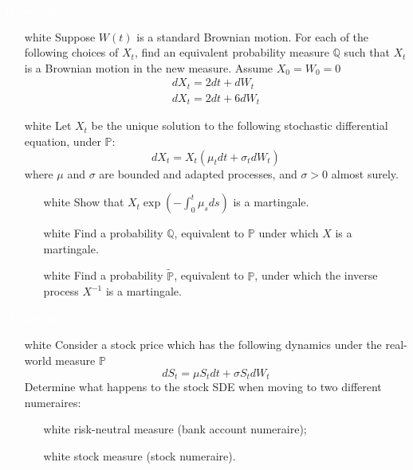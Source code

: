 \documentclass{beamer}
\begin{document}
\begin{homework}
	\begin{frame}{\textcolor{white}{Homework}}
		\begin{itemize}
			\item[white] Suppose $W(t)$ is a standard Brownian motion. For each of the following choices of $X_t$, find an equivalent probability measure $\mathbb{Q}$ such that $X_t$ is a Brownian motion in the new measure. Assume $X_0=W_0=0$
			\begin{equation*}
				\begin{gathered}
					dX_t = 2dt + dW_t\\
					dX_t = 2dt + 6dW_t
				\end{gathered}
			\end{equation*}
		\item[white] Let $X_t$ be the unique solution to the following stochastic differential equation, under $\mathbb{P}$:
		\begin{equation*}
			dX_t = X_t(\mu_t dt + \sigma_t dW_t)
		\end{equation*}
		where $\mu$ and $\sigma$ are bounded and adapted processes, and $\sigma >0$ almost surely.
		\begin{itemize}
			\item[white] Show that $X_t\exp(-\int_0^t \mu_s ds)$ is a martingale.
			\item[white] Find a probability $\mathbb{Q}$, equivalent to $\mathbb{P}$ under which $X$ is a martingale.
			\item[white] Find a probability $\tilde{\mathbb{P}}$, equivalent to $\mathbb{P}$, under which the inverse process $X^{-1}$ is a martingale.
		\end{itemize}
		\end{itemize}
	\end{frame}
\end{homework}


\begin{homework}
\begin{frame}{\textcolor{white}{Homework}}
\begin{itemize}
\item[white] Consider a stock price which has the following dynamics under the real-world measure $\mathbb{P}$
\begin{equation*}
	dS_t = \mu S_t dt + \sigma S_t dW_t
\end{equation*}
Determine what happens to the stock SDE when moving to two different numeraires:
\begin{itemize}
\item[white] risk-neutral measure (bank account numeraire);
\item[white] stock measure (stock numeraire).
\end{itemize}
\end{itemize}
\end{frame}
\end{homework}
\end{document}
